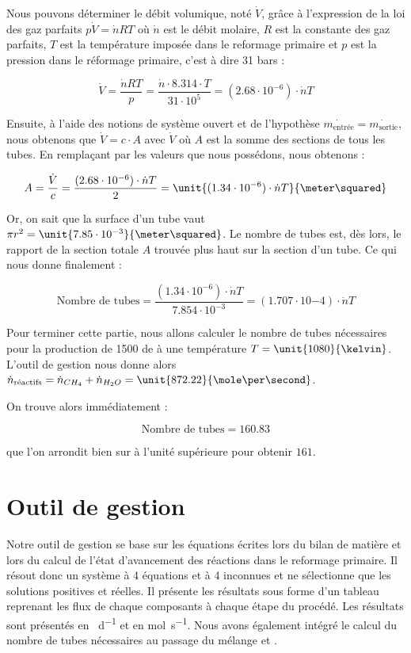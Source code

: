 Nous pouvons déterminer le débit volumique, noté $\dot{V}$, grâce à l'expression de la loi des gaz
parfaits $p\dot{V} = \dot{n}RT$ où $\dot{n}$ est le débit molaire, $R$ est la constante des gaz parfaits,
$T$ est la température imposée dans le reformage primaire et $p$ est la
pression dans le réformage primaire, c'est à dire 31 bars :

$$\dot{V} = \frac{\dot{n}RT}{p} = \frac{\dot{n}\cdot 8.314\cdot T}{31\cdot10^5}
 = (2.68\cdot10^{-6})\cdot \dot{n}T$$

Ensuite, à l'aide des notions de système ouvert et de l'hypothèse 
$\dot{m_{\text{entrée}}} = \dot{m_{\text{sortie}}}$, nous obtenons que $\dot{V} 
= c \cdot  A $ avec $ \dot{V}$ où $A$ est la somme des sections de tous les tubes.
En remplaçant par les valeurs que nous possédons, nous obtenons :

$$A = \frac{\dot{V}}{c} = \frac{(2.68\cdot10^{-6})\cdot \dot{n}T}{2} 
= \unit{(1.34\cdot10^{-6})\cdot \dot{n}T}{\meter\squared}$$

Or, on sait que la surface d'un tube vaut $\pi r^2
= \unit{7.85\cdot10^{-3}}{\meter\squared}$. Le nombre de tubes est,
dès lors, le rapport de la section totale $A$ trouvée plus haut sur
la section d'un tube. Ce qui nous donne finalement : 

$$\text{Nombre de tubes} = \frac{(1.34\cdot10^{-6})\cdot \dot{n}T}{7.854\cdot10^{-3}}
= (1.707\cdot10{-4})\cdot\dot{n}T$$

Pour terminer cette partie, nous allons calculer le nombre de tubes
nécessaires pour la production de \unit{1500}{\ton\per\dday} de 
à une température $T = \unit{1080}{\kelvin}$. L'outil de gestion
nous donne alors $\dot{n}_{\text{réactifs}} = \dot{n}_{CH_4} + \dot{n}_{H_2O} 
= \unit{872.22}{\mole\per\second}$.

On trouve alors immédiatement :

$$\text{Nombre de tubes} = 160.83$$

que l'on arrondit bien sur à l'unité supérieure pour obtenir $161$.

\section{Outil de gestion}
Notre outil de gestion se base sur les équations écrites lors du
bilan de matière et lors du calcul de l'état d'avancement des réactions
dans le reformage primaire. Il résout donc un système à 4 équations
et à 4 inconnues et ne sélectionne que les solutions positives et réelles.
Il présente les résultats sous forme d'un tableau reprenant les flux de chaque
composants à chaque étape du procédé. Les résultats sont présentés en \unit{\ton\per\day} et en \unit{\mole\per\second}.
Nous avons également intégré le calcul du nombre de tubes nécessaires au
passage du mélange  et .


